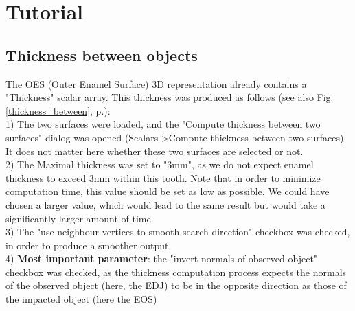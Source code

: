 \documentclass[12pt, a4paper]{book}
\begin{document}
\section{Tutorial}

\subsection{Thickness between objects}
The OES (Outer Enamel Surface) 3D representation already contains a "Thickness" scalar array. This thickness was produced as follows (see also Fig. \ref{thickness_between}, p.\pageref{thickness_between}): \\
1) The two surfaces were loaded, and the "Compute thickness between two surfaces" dialog was opened (Scalars->Compute thickness between two surfaces). It does not matter here whether these two surfaces are selected or not.\\
2) The Maximal thickness was set to "3mm", as we do not expect enamel thickness to exceed 3mm within this tooth. Note that in order to minimize computation time, this value should be set as low as possible. We could have chosen a larger value, which would lead to the same result but would take a significantly larger amount of time.\\
3) The "use neighbour vertices to smooth search direction" checkbox was checked, in order to produce a smoother output. \\
4) \textbf{Most important parameter}: the "invert normals of observed object" checkbox was checked, as the thickness computation process expects the normals of the observed object (here, the EDJ) to be in the opposite direction as those of the impacted object (here the EOS) \\
\end{document}
